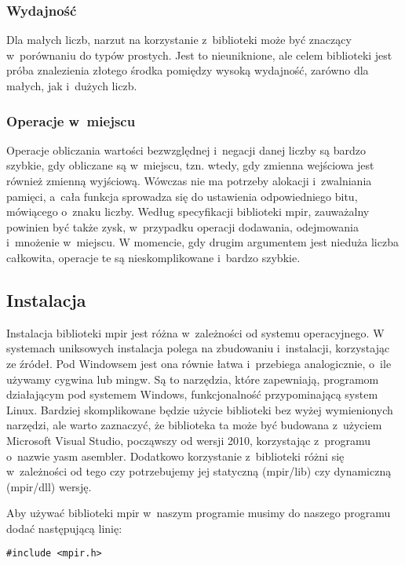 \subsubsection{Wydajność}
Dla małych liczb, narzut na korzystanie z~biblioteki może być znaczący w~porównaniu do typów prostych. Jest to nieuniknione, ale celem biblioteki jest próba znalezienia złotego środka pomiędzy wysoką wydajność, zarówno dla małych, jak i~dużych liczb. 

\subsubsection{Operacje w~miejscu}
Operacje obliczania wartości bezwzględnej i~negacji danej liczby są bardzo szybkie, gdy obliczane są w~miejscu, tzn. wtedy, gdy zmienna wejściowa jest również zmienną wyjściową. Wówczas nie ma potrzeby alokacji i~zwalniania pamięci, a~cała funkcja sprowadza się do ustawienia odpowiedniego bitu, mówiącego o~znaku liczby. Według specyfikacji biblioteki mpir, zauważalny powinien być także zysk, w~przypadku operacji dodawania, odejmowania i~mnożenie w~miejscu. W momencie, gdy drugim argumentem jest nieduża liczba całkowita, operacje te są nieskomplikowane i~bardzo szybkie.

\subsection{Instalacja}

Instalacja biblioteki mpir jest różna w~zależności od systemu operacyjnego. W systemach uniksowych instalacja polega na zbudowaniu i~instalacji, korzystając ze źródeł. Pod Windowsem jest ona równie łatwa i~przebiega analogicznie, o~ile używamy cygwina lub mingw. Są to narzędzia, które zapewniają, programom działającym pod systemem Windows, funkcjonalność przypominającą system Linux. Bardziej skomplikowane będzie użycie biblioteki bez wyżej wymienionych narzędzi, ale warto zaznaczyć, że biblioteka ta może być budowana z~użyciem Microsoft Visual Studio, począwszy od wersji 2010, korzystając z~programu o~nazwie yasm asembler. Dodatkowo korzystanie z~biblioteki różni się w~zależności od tego czy potrzebujemy jej statyczną (mpir/lib) czy dynamiczną (mpir/dll) wersję.

Aby używać biblioteki mpir w~naszym programie musimy do naszego programu dodać następującą linię:
\begin{lstlisting}
#include <mpir.h>
\end{lstlisting}

